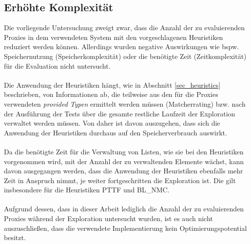 \subsection{Erhöhte Komplexität}
Die vorliegende Untersuchung zweigt zwar, dass die Anzahl der zu evaluierenden Proxies in dem verwendeten System mit den vorgeschlagenen Heuristiken reduziert werden können. Allerdings wurden negative Auswirkungen wie bspw. Speichernutzung (Speicherkomplexität) oder die benötigte Zeit  (Zeitkomplexität) für die Evaluation nicht untersucht.
\\\\
Die Anwendung der Heuristiken hängt, wie in Abschnitt \ref{sec_heuristics} beschrieben, von Informationen ab, die teilweise aus den für die Proxies verwendeten \emph{provided Typen} ermittelt werden müssen (Matcherrating) bzw. nach der Ausführung der Tests über die gesamte restliche Laufzeit der Exploration verwaltet werden müssen. Von daher ist davon auszugehen, dass sich die Anwendung der Heuristiken durchaus auf den Speicherverbrauch auswirkt.
\\\\
Da die benötigte Zeit für die Verwaltung von Listen, wie sie bei den Heuristiken vorgenommen wird, mit der Anzahl der zu verwaltenden Elemente wächst, kann davon ausgegangen werden, dass die Anwendung der Heuristiken ebenfalls mehr Zeit in Anspruch nimmt, je weiter fortgeschritten die Exploration ist. Die gilt insbesondere für die Heuristiken PTTF und BL\_NMC. 
\\\\
Aufgrund dessen, dass in dieser Arbeit lediglich die Anzahl der zu evaluierenden Proxies während der Exploration untersucht wurden, ist es auch nicht auszuschließen, dass die verwendete Implementierung kein Optimierungspotential besitzt.

